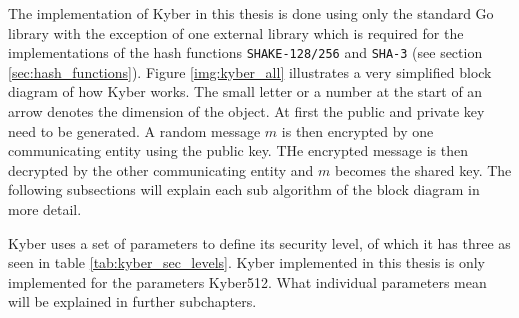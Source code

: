 The implementation of Kyber in this thesis is done using only the standard Go library with the exception of one external library \cite{00fV2cvg7Z6H2tS3} which is required for the implementations of the hash functions \texttt{SHAKE-128/256} and \texttt{SHA-3} (see section \ref{sec:hash_functions}). Figure \ref{img:kyber_all} illustrates a very simplified block diagram of how Kyber works. The small letter or a number at the start of an arrow denotes the dimension of the object. At first the public and private key need to be generated. A random message $m$ is then encrypted by one communicating entity using the public key. THe encrypted message is then decrypted by the other communicating entity and $m$ becomes the shared key. The following subsections will explain each sub algorithm of the block diagram in more detail.

Kyber uses a set of parameters to define its security level, of which it has three as seen in table \ref{tab:kyber_sec_levels}. Kyber implemented in this thesis is only implemented for the parameters Kyber512. What individual parameters mean will be explained in further subchapters.

